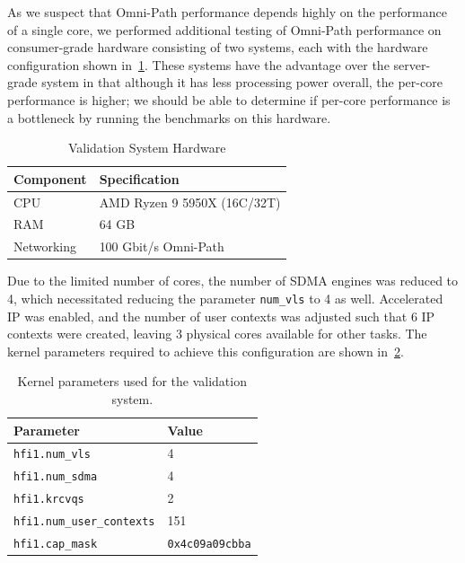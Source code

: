 As we suspect that Omni-Path performance depends highly on the performance of a single core, we performed additional testing of Omni-Path performance on consumer-grade hardware consisting of two systems, each with the hardware configuration shown in~\cref{tbl:validation-system}. These systems have the advantage over the server-grade system in that although it has less processing power overall, the per-core performance is higher; we should be able to determine if per-core performance is a bottleneck by running the benchmarks on this hardware.

\begin{table}[h]
\centering
\begin{tabular}{|ll|}
\hline
\textbf{Component} & \textbf{Specification} \\
\hline
CPU        & AMD Ryzen 9 5950X (16C/32T) \\
RAM        & 64 GB \\
Networking & 100 Gbit/s Omni-Path \\
\hline
\end{tabular}
\caption{Validation System Hardware}
\label{tbl:validation-system}
\end{table}

Due to the limited number of cores, the number of \ac{SDMA} engines was reduced to 4, which necessitated reducing the parameter \texttt{num\_vls} to 4 as well. Accelerated \ac{IP} was enabled, and the number of user contexts was adjusted such that 6 \ac{IP} contexts were created, leaving 3 physical cores available for other tasks. The kernel parameters required to achieve this configuration are shown in~\cref{tbl:validation-system-kernel-opts}.

\begin{table}[h]
    \centering
    \begin{tabular}{|ll|}
        \hline
        \textbf{Parameter} & \textbf{Value} \\
        \hline
        \texttt{hfi1.num\_vls} & 4 \\
        \texttt{hfi1.num\_sdma} & 4 \\
        \texttt{hfi1.krcvqs} & 2 \\
        \texttt{hfi1.num\_user\_contexts} & 151 \\
        \texttt{hfi1.cap\_mask} & \texttt{0x4c09a09cbba} \\
        \hline
    \end{tabular}
    \caption[Kernel Parameters for Validation System]{Kernel parameters used for the validation system.}
    \label{tbl:validation-system-kernel-opts}
\end{table}

